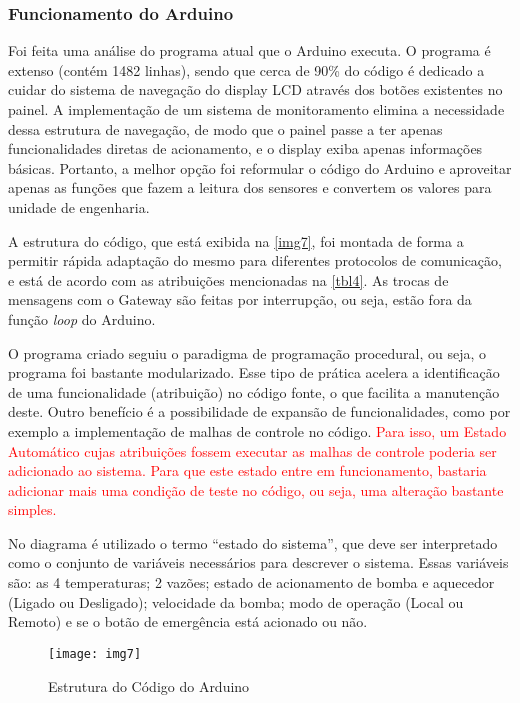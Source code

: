 			
			\subsubsection{Funcionamento do Arduino}
			
				Foi feita uma análise do programa atual que o Arduino executa. O programa é extenso (contém 1482 linhas), sendo que cerca de 90\% do código é dedicado a cuidar do sistema de navegação do display LCD através dos botões existentes no painel.  A implementação de um sistema de monitoramento elimina a necessidade dessa estrutura de navegação, de modo que o painel passe a ter apenas funcionalidades diretas de acionamento, e o display exiba apenas informações básicas. Portanto, a melhor opção foi reformular o código do Arduino e aproveitar apenas as funções que fazem a leitura dos sensores e convertem os valores para unidade de engenharia.
				
				A estrutura do código, que está exibida na \autoref{img7}, foi montada de forma a permitir rápida adaptação do mesmo para diferentes protocolos de comunicação, e está de acordo com as atribuições mencionadas na \autoref{tbl4}. As trocas de mensagens com o Gateway são feitas por interrupção, ou seja, estão fora da função \textit{loop} do Arduino. 
				
				O programa criado seguiu o paradigma de programação procedural, ou seja, o programa foi bastante modularizado. Esse tipo de prática acelera a identificação de uma funcionalidade (atribuição) no código fonte, o que facilita a manutenção deste. Outro benefício é a possibilidade de expansão de funcionalidades, como por exemplo a implementação de malhas de controle no código. \textcolor{red}{ Para isso, um Estado Automático cujas atribuições fossem executar as malhas de controle poderia ser adicionado ao sistema. Para que este estado entre em funcionamento, bastaria adicionar mais uma condição de teste no código, ou seja, uma alteração bastante simples.}
				
				No diagrama é utilizado o termo ``estado do sistema'', que deve ser interpretado como o conjunto de variáveis necessários para descrever o sistema. Essas variáveis são: as 4 temperaturas; 2 vazões; estado de acionamento de bomba e aquecedor (Ligado ou Desligado); velocidade da bomba; modo de operação (Local ou Remoto) e se o botão de emergência está acionado ou não.
			
				\begin{figure}[!htb]	
					\captionsetup{justification=centering}
					\begin{center}
						\texttt{[image: img7]}  %
						\caption[Estrutura do Código do Arduino]{\label{img7} Estrutura do Código do Arduino }
					\end{center}		
				\end{figure}
			
